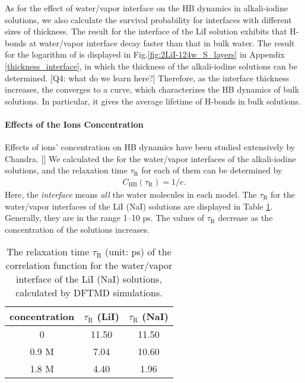 As for the effect of water/vapor interface on the HB dynamics in alkali-iodine solutions,
we also calculate the survival probability for interfaces with different sizes of thickness. 
The result for the interface of the LiI solution exhibits that H-bonds at water/vapor 
interface decay faster than that in bulk water.
The result for the logarithm of \SHB is displayed in Fig.\space\ref{fig:2LiI-124w_S_layers} in Appendix \ref{thickness_interface}, 
in which the thickness of the alkali-iodine solutions can be determined.
{\color{red}[Q4: what do we learn here?]}
{\color{blue}Therefore, as the interface thickness increases, the \SHB converges to a curve, 
which characterizes the HB dynamics of bulk solutions. 
In particular, it gives the average lifetime of H-bonds in bulk solutions.}
\FloatBarrier
\paragraph{Effects of the Ions Concentration}
Effects of ions' concentration on HB dynamics have been studied extensively by Chandra. [\cite{AC00}]
We calculated the \CHB for the water/vapor interfaces of the alkali-iodine solutions, 
and the relaxation time $\tau_{\text{R}}$ for each of them can be determined by 
\begin{eqnarray}
        C_{\text{HB}}(\tau_\text{{R}})=1/e. \nonumber
\label{eq:relaxation_time}
\end{eqnarray}
Here, the \emph{interface} means \emph{all} the water molecules in each model. 
The $\tau_{\text{R}}$ for the water/vapor interfaces of the LiI (NaI) solutions are displayed in 
Table \ref{tab:tau_hb}. Generally, they are in the range 1--10 ps. 
The values of $\tau_{\text{R}}$ decrease as the concentration of the solutions increases.
\begin{table}[htbp]
\centering
\caption{\label{tab:tau_hb} 
  The relaxation time $\tau_{\text{R}}$ (unit: ps) of the correlation function \CHB  for the water/vapor interface of the LiI (NaI) solutions, calculated by DFTMD simulations.}
\begin{tabular}{ccc}
  concentration  & $\tau_{\text{R}}$ (LiI) & $\tau_{\text{R}}$ (NaI) \\
\hline
  0 & 11.50 & 11.50 \\
  0.9 M & 7.04 & 10.60 \\
  1.8 M & 4.40 & 1.96 
\end{tabular}
\end{table}

